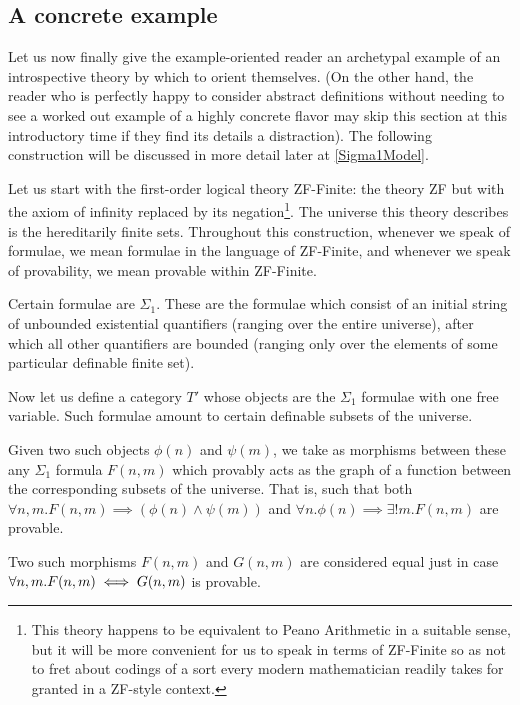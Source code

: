 \subsection{A concrete example}

\begin{construction}\label{SigmaModelSimple}
Let us now finally give the example-oriented reader an archetypal example of an introspective theory by which to orient themselves. (On the other hand, the reader who is perfectly happy to consider abstract definitions without needing to see a worked out example of a highly concrete flavor may skip this section at this introductory time if they find its details a distraction). The following construction will be discussed in more detail later at \cref{Sigma1Model}.
\end{construction}

Let us start with the first-order logical theory ZF-Finite: the theory ZF but with the axiom of infinity replaced by its negation\footnote{This theory happens to be equivalent to Peano Arithmetic in a suitable sense, but it will be more convenient for us to speak in terms of ZF-Finite so as not to fret about codings of a sort every modern mathematician readily takes for granted in a ZF-style context.}. The universe this theory describes is the hereditarily finite sets. Throughout this construction, whenever we speak of formulae, we mean formulae in the language of ZF-Finite, and whenever we speak of provability, we mean provable within ZF-Finite.

Certain formulae are $\Sigma_1$. These are the formulae which consist of an initial string of unbounded existential quantifiers (ranging over the entire universe), after which all other quantifiers are bounded (ranging only over the elements of some particular definable finite set).

Now let us define a category $T'$ whose objects are the $\Sigma_1$ formulae with one free variable. Such formulae amount to certain definable subsets of the universe.

Given two such objects $\phi(n)$ and $\psi(m)$, we take as morphisms between these any $\Sigma_1$ formula $F(n, m)$ which provably acts as the graph of a function between the corresponding subsets of the universe. That is, such that both $\forall n, m . F(n, m) \implies (\phi(n) \wedge \psi(m))$ and $\forall n . \phi(n) \implies \exists! m . F(n, m)$ are provable.

Two such morphisms $F(n, m)$ and $G(n, m)$ are considered equal just in case $\forall n, m . F(n, m) \iff G(n, m)$ is provable. 

